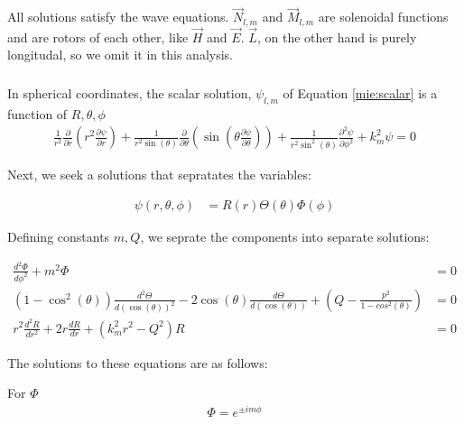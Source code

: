             All solutions satisfy the wave equations. $\vec{N}_{l,m}$ and $\vec{M}_{l,m}$ are solenoidal functions and are rotors of each other,
            like $\vec{H}$ and $\vec{E}$. $\vec{L}$, on the other hand is purely longitudal, so we omit it in this analysis.

        \subsubsection{}

            In spherical coordinates, the scalar solution, $\psi_{l,m}$ of Equation \ref{mie:scalar} is a function of ${R, \theta, \phi}$
            \begin{align}
                \frac{1}{r^2}\frac{\partial}{\partial r}\left(r^2\frac{\partial\psi}{\partial r}\right)
                    + \frac{1}{r^2\sin(\theta)}\frac{\partial}{\partial\theta}\left(\sin(\theta\frac{\partial\psi}{\partial\theta})\right)
                    + \frac{1}{r^2\sin^2(\theta)}\frac{\partial^2\psi}{\partial\phi^2} + k^2_m\psi = 0
            \end{align}

            Next, we seek a solutions that sepratates the variables:

            \begin{align}
                \psi(r,\theta,\phi) &= R(r)\Theta(\theta)\Phi(\phi)
            \end{align}

            Defining constants $m, Q$, we seprate the components into separate solutions:

            \begin{align}
                \frac{d^2\Phi}{d\phi^2} + m^2\Phi &= 0 \\
                (1 - \cos^2(\theta))\frac{d^2\Theta}{d(\cos(\theta))^2} - 2\cos(\theta)\frac{d\Theta}{d(\cos(\theta))}
                    + (Q - \frac{p^2}{1-cos^2(\theta)}) &= 0 \\
                r^2\frac{d^2R}{dr^2} + 2r\frac{dR}{dr} + (k^2_mr^2 - Q^2)R &= 0
            \end{align}

            The solutions to these equations are as follows:

            For $\Phi$
            \begin{align}
                \Phi = e^{\pm i m \phi}
            \end{align}

